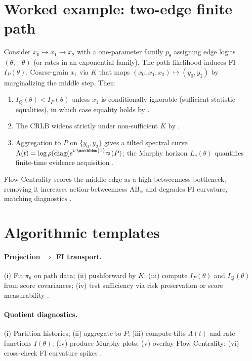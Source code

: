 \documentclass[11pt]{article}
\theoremstyle{plain}
\theoremstyle{definition}
\theoremstyle{remark}
\newcommand{\1}{\mathbbm{1}}
\begin{document}
\section{Worked example: two-edge finite path}
Consider \(x_0\to x_1\to x_2\) with a one-parameter family \(p_\theta\) assigning edge logits \((\theta,-\theta)\) (or rates in an exponential family). The path likelihood induces FI \(I_P(\theta)\). Coarse-grain \(x_1\) via \(K\) that maps \((x_0,x_1,x_2)\mapsto(y_0,y_2)\) by marginalizing the middle step. Then:
\begin{enumerate}
  \item \(I_Q(\theta) < I_P(\theta)\) unless \(x_1\) is conditionally ignorable (sufficient statistic equalities), in which case equality holds by  \parencite{AmariNagaoka2000,Cencov1982}.
  \item The CRLB widens strictly under non-sufficient \(K\) by  \parencite[Ch.\ 2]{CoverThomas2006}.
  \item Aggregation to \(P\) on \(\{y_0,y_2\}\) gives a tilted spectral curve \(\Lambda(t)=\log\rho(\mathrm{diag}(e^{t\cdot\1_{y_2}})P)\); the Murphy horizon \(L_c(\theta)\) quantifies finite-time evidence acquisition \parencite{DemboZeitouni1998,elliott2025pmb}.
\end{enumerate}
Flow Centrality scores the middle edge as a high-betweenness bottleneck; removing it increases action-betweenness \(\mathrm{AB}_\alpha\) and degrades FI curvature, matching diagnostics \parencite{elliott2025flow,elliott2025qfi}.

\section{Algorithmic templates}
\paragraph{Projection \(\Rightarrow\) FI transport.} (i) Fit \(\pi_\theta\) on path data; (ii) pushforward by \(K\); (iii) compute \(I_P(\theta)\) and \(I_Q(\theta)\) from score covariances; (iv) test sufficiency via risk preservation or score measurability \parencite{Blackwell1953,AmariNagaoka2000}.

\paragraph{Quotient diagnostics.} (i) Partition histories; (ii) aggregate to \(P\); (iii) compute tilts \(\Lambda(t)\) and rate functions \(I(\theta)\); (iv) produce Murphy plots; (v) overlay Flow Centrality; (vi) cross-check FI curvature spikes \parencite{elliott2025qfi,DemboZeitouni1998,elliott2025flow,elliott2025pmb}.
\end{document}
